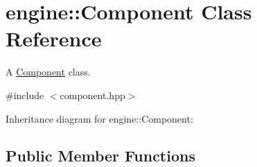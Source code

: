 \hypertarget{classengine_1_1_component}{}\section{engine\+:\+:Component Class Reference}
\label{classengine_1_1_component}


A \hyperlink{classengine_1_1_component}{Component} class.  




{\ttfamily \#include $<$component.\+hpp$>$}



Inheritance diagram for engine\+:\+:Component\+:
\subsection*{Public Member Functions}
